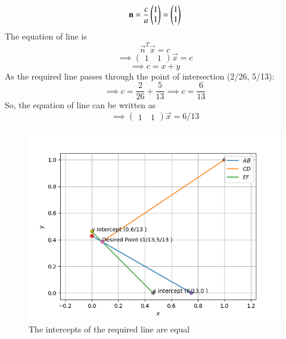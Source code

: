\documentclass[journal,12pt,twocolumn]{IEEEtran}
\begin{document}
\begin{flushleft}
\begin{equation}
\mathbf{n} = \frac{c}{a}\begin{pmatrix}1\\1\end{pmatrix} = \begin{pmatrix}1\\1\end{pmatrix}
\end{equation}
The equation of line is
\begin{equation}
	{\vec{n}^T}{\vec{x}} = c 
\end{equation}
\begin{equation}
\implies
\begin{pmatrix}
	1 &\
	1
\end{pmatrix}
	{\vec{x}} = c
\end{equation}
\begin{equation}
\implies
c= x+y 
\end{equation}
As the required line passes through the point of intersection (2/26, 5/13):
\begin{equation}
\implies c=\frac{2}{26}+\frac{5}{13}
\implies c=\frac{6}{13}
\end{equation}
So, the equation of line can be written as
\begin{equation}
\implies
\begin{pmatrix}
	1 &\
	1
\end{pmatrix}
	{\vec{x}} = 6/13
\end{equation}
\begin{figure}[!ht]
\centering
\includegraphics[width=\columnwidth]{Assignment_1}
 \caption{The intercepts of the required line are equal}
\end{figure}
\end{flushleft}
\end{document}
